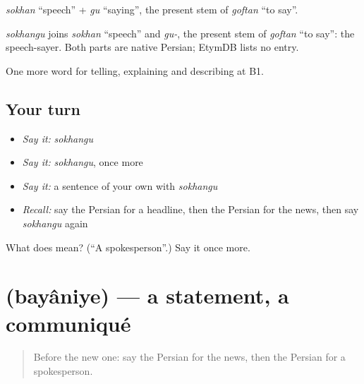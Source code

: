 \emph{sokhan} \textquotedblleft{}speech\textquotedblright{} + \emph{gu} \textquotedblleft{}saying\textquotedblright{}, the present stem of \emph{goftan} \textquotedblleft{}to say\textquotedblright{}.

\begin{cousinweb}
\emph{sokhangu} joins \emph{sokhan} \textquotedblleft{}speech\textquotedblright{} and \emph{gu-}, the present stem of \emph{goftan} \textquotedblleft{}to say\textquotedblright{}: the speech-sayer. Both parts are native Persian; EtymDB lists no entry.
\end{cousinweb}

\begin{grammarlens}[title={What you've built}]
One more word for telling, explaining and describing at B1.
\end{grammarlens}

\subsection*{Your turn}
\begin{itemize}
\raggedright
  \item \emph{Say it:} \emph{sokhangu}
  \item \emph{Say it:} \emph{sokhangu}, once more
  \item \emph{Say it:} a sentence of your own with \emph{sokhangu}
  \item \emph{Recall:} say the Persian for a headline, then the Persian for the news, then say \emph{sokhangu} again
\end{itemize}

\begin{tcolorbox}[breakable,colback=teal!4,colframe=teal!35!black,title={Before you move on}]
What does  mean? (\textquotedblleft{}A spokesperson\textquotedblright{}.) Say it once more.
\end{tcolorbox}
\section[\texorpdfstring{\fa{بیانیه} (bayâniye)}{بیانیه (bayâniye)}]{ (bayâniye) — a statement, a communiqué}

\label{lesson:FA-C309-bayaniye}



\begin{quote}
Before the new one: say the Persian for the news, then the Persian for a spokesperson.
\end{quote}

